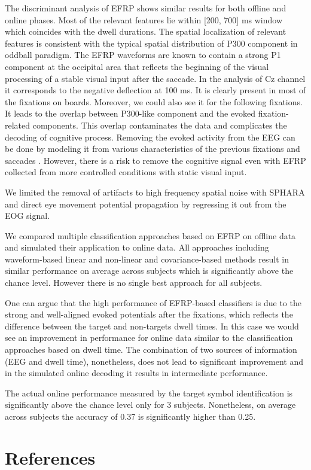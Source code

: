 \documentclass[12pt]{iopart}
\begin{document}
The discriminant analysis of EFRP shows similar results for both
offline and online phases. Most of the relevant
features lie within [200, 700] ms window which coincides with the dwell
durations. The spatial localization of relevant features is consistent with the typical
spatial distribution of P300 component in oddball paradigm.
The EFRP waveforms are known to contain a strong P1 component at the occipital
area that reflects the beginning of the visual processing of a stable visual input
after the saccade. In the analysis of Cz channel it corresponds to the negative
deflection at 100 ms. It is clearly present in most of the fixations on boards.
Moreover, we could also see it for the following fixations.
It leads to the overlap between P300-like component and 
the evoked fixation-related components. This overlap contaminates the
data and complicates the decoding of cognitive process.
Removing the evoked activity from the EEG can be done
by modeling it from various characteristics of the previous fixations and saccades \cite{nikolaev_combining_2016}.
However, there is a risk to remove the cognitive signal even with EFRP collected
from more controlled conditions with static visual input.

We limited the removal of artifacts to high frequency spatial noise with SPHARA 
and direct eye movement potential propagation by regressing it out 
from the EOG signal.

We compared multiple classification approaches based on EFRP on offline data and 
simulated their application to online data.
All approaches including waveform-based linear and non-linear and covariance-based 
methods result in similar performance on average across subjects
which is significantly above the chance level.
However there is no single best approach for all subjects.

One can argue that the high performance of EFRP-based classifiers is
due to the strong and well-aligned evoked potentials after the fixations,
which reflects the difference between the target and non-targets dwell times.
In this case we would see an improvement in performance for online data
similar to the classification approaches based on dwell time.
The combination of two sources of information (EEG and dwell time), nonetheless,
does not lead to significant improvement and in the simulated online
decoding it results in intermediate performance.

The actual online performance measured by the target symbol identification
is significantly above the chance level only for 3 subjects.
Nonetheless, on average across subjects the accuracy of 0.37 is 
significantly higher than 0.25.



\section*{References}



\end{document}
